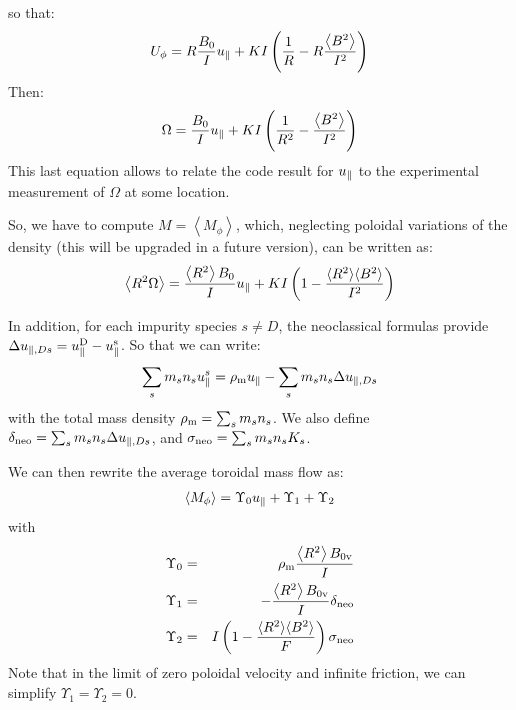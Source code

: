 so that:
\begin{eqnarray}
U_\phi = R \frac{B_0}{I}u_\parallel + K I \left(\frac{1}{R}-R\frac{\left\langle B^2 \right\rangle}{I^2}\right)
\label{omegafromupar}
\end{eqnarray} 
Then:
\begin{eqnarray}
\Omega =\frac{B_0}{I}u_\parallel + K I \left(\frac{1}{R^2}-\frac{\left\langle B^2 \right\rangle}{I^2}\right)
\label{uparperp4}
\end{eqnarray}
This last equation allows to relate the code result for $u_\parallel$ to the experimental measurement of $\Omega$ at some location. 

So, we have to compute $M= \left\langle M_\phi \right\rangle$, which, neglecting poloidal variations of the density (this will be upgraded in a future version), can be written as:
\begin{eqnarray}
\left\langle R^2 \Omega \right\rangle = \frac{\left\langle R^2 \right\rangle B_0}{I}u_\parallel+KI\left(1- \frac{\langle R^2  \rangle \langle B^2 \rangle }{I^2} \right)
\label{r2omupara}
\end{eqnarray}

In addition, for each impurity species $s\neq D$, the neoclassical formulas provide $\Delta u_{\parallel,Ds}=u_\parallel^{\rm D}-u_\parallel^{\rm s}$.
So that we can write:
\begin{eqnarray}
\sum_s m_s n_s u_\parallel^{s}=\rho_{\rm m} u_\parallel-\sum_s m_s n_s \Delta u_{\parallel,Ds}
\label{mphineoc}
\end{eqnarray}
with the total mass density $\rho_{\rm m}=\sum_s m_s n_s $. We also define $\delta_{\rm neo}=\sum_s m_s n_s \Delta u_{\parallel,Ds}$, and $\sigma_{\rm neo}=\sum_s m_s n_s K_s$.

We can then rewrite the average toroidal mass flow as:
\begin{eqnarray}
\left\langle M_\phi \right\rangle=\Upsilon_0 u_\parallel + \Upsilon_1 + \Upsilon_2
\label{mphiavupar}
\end{eqnarray}
with 
\begin{eqnarray}
\Upsilon_0&=&\rho_{\rm m}\frac{\left\langle R^2 \right\rangle B_{\rm 0v}}{I}
\nonumber \\
\Upsilon_1&=&-\frac{\left\langle R^2 \right\rangle B_{\rm 0v}}{I}\delta_{\rm neo}
\nonumber \\
\Upsilon_2&=&I\left(1- \frac{\langle R^2  \rangle \langle B^2 \rangle }{F} \right)\sigma_{\rm neo} 
\label{ABdefs}
\end{eqnarray}
Note that in the limit of zero poloidal velocity and infinite friction, we can simplify $\Upsilon_1=\Upsilon_2=0$.

